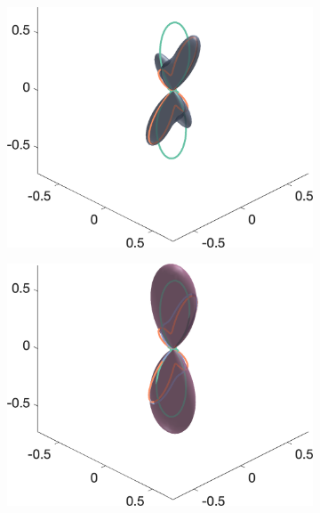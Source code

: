 \begin{figure}
{\begin{minipage}[c]{\textwidth}
\begin{subfigure}[]{0.245\textwidth}
  \end{subfigure}
  \begin{subfigure}[]{0.245\textwidth}
    \includegraphics[width=\textwidth]{figures/frf_experiment/fibres_fod_3D_kappa2_b_3000n_3}
  \end{subfigure}
  \begin{subfigure}[]{0.245\textwidth}
    \includegraphics[width=\textwidth]{figures/frf_experiment/fibres_fod_3D_kappa2_b_3000n_4_f1}
  \end{subfigure}
  \end{minipage}
}
\end{figure}
